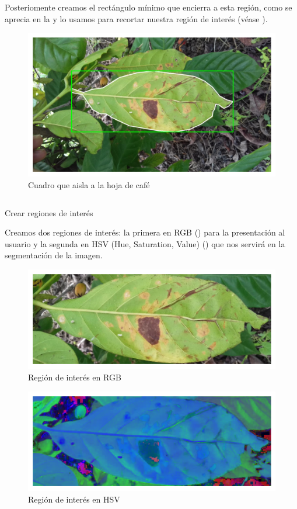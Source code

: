 Posteriomente creamos el rectángulo mínimo que encierra a esta región, como se aprecia en la  y lo usamos para recortar nuestra región de interés (véase ).

\begin{figure}[!ht]
\centering
\includegraphics[scale=1]{images/bounding_rect.png}
\caption{Cuadro que aisla a la hoja de café}
\label{img:bounding_rect}
\end{figure}

\begin{listing}[!ht]
\inputminted{python}{code_listings/roi.py}
\caption{Crear regiones de interés}
\label{code:roi}
\end{listing}

Creamos dos regiones de interés: la primera en \textsf{RGB} () para la presentación al usuario y la segunda en \textsf{HSV} (Hue, Saturation, Value) () que nos servirá en la segmentación de la imagen.

\begin{figure}[!ht]
\centering
\includegraphics[scale=1]{images/roi_rgb.png}
\caption{Región de interés en RGB}
\label{img:roi_rgb}
\end{figure}

\begin{figure}[!ht]
\centering
\includegraphics[scale=1]{images/roi_hsv.png}
\caption{Región de interés en HSV}
\label{img:roi_hsv}
\end{figure}


